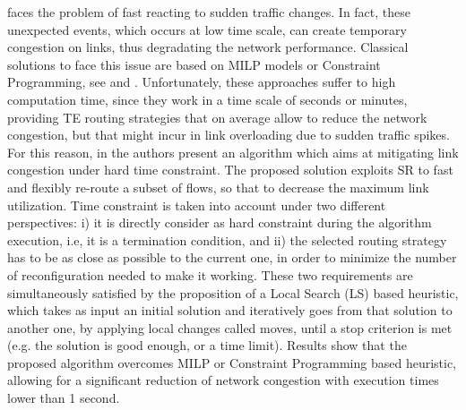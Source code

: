 \cite{gay2017expect} faces the problem of fast reacting to sudden traffic changes. In fact, these unexpected events, which occurs at low time scale, can create temporary congestion on links, thus degradating the network performance.
Classical solutions to face this issue are based on MILP models or Constraint Programming, see \cite{optimizedte} and \cite{defo1}. Unfortunately, these approaches suffer to high computation time, since they work in a time scale of seconds or minutes, providing TE routing strategies that on average allow to reduce the network congestion, but that might incur in link overloading due to sudden traffic spikes.
For this reason, in \cite{gay2017expect} the authors present an algorithm which aims at mitigating link congestion under hard time constraint.
The proposed solution exploits SR to fast and flexibly re-route a subset of flows, so that to decrease the maximum link utilization. Time constraint is taken into account under two different perspectives: i) it is directly consider as hard constraint during the algorithm execution, i.e, it is a termination condition, and ii) the selected routing strategy has to be as close as possible to the current one, in order to minimize the number of reconfiguration needed to make it working.
These two requirements are simultaneously satisfied by the proposition of a Local Search (LS) based heuristic, which takes as input an initial solution and iteratively goes from that solution to another one, by applying local changes called moves, until a stop criterion is met (e.g. the solution is good enough, or a time limit). 
Results show that the proposed algorithm overcomes MILP or Constraint Programming based heuristic, allowing for a significant reduction of network congestion with execution times lower than 1 second.

